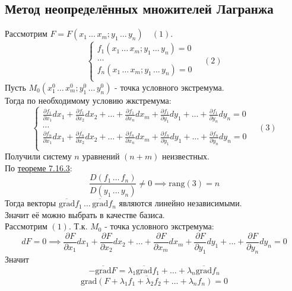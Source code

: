 \documentclass[12pt]{article}
\begin{document}
    \subsection{Метод неопределённых множителей Лагранжа}
    Рассмотрим $F = F(x_1\, \dots\, x_m; y_1\, \dots\, y_n) \quad (1)$.
    \[ \begin{cases}
        f_1(x_1\, \dots\, x_m; y_1\, \dots\, y_n) = 0\\
        \dots\\
        f_n(x_1\, \dots\, x_m; y_1\, \dots\, y_n) = 0\\
    \end{cases} \quad (2) \]
    Пусть $M_0 (x^0_1\, \dots\, x^0_m; y^0_1\, \dots\, y^0_n)$ - точка условного экстремума.\\
    Тогда по необходимому условию жкстремума:
    \[ 
        \begin{cases}
            \frac{\partial f_1}{\partial x_1}dx_1 + \frac{\partial f_1}{\partial x_2}dx_2 + \dots + \frac{\partial f_1}{\partial x_n}dx_m + \frac{\partial f_1}{\partial y_1}dy_1 + \dots + \frac{\partial f_1}{\partial y_n}dy_n = 0\\
            \dots\\
            \frac{\partial f_n}{\partial x_1}dx_1 + \frac{\partial f_n}{\partial x_2}dx_2 + \dots + \frac{\partial f_n}{\partial x_n}dx_m + \frac{\partial f_n}{\partial y_1}dy_1 + \dots + \frac{\partial f_n}{\partial y_n}dy_n = 0\\
        \end{cases} \quad (3)
    \]
    Получили систему $n$ уравнений $(n + m)$ неизвестных.\\
    По \hyperref[th:7.16.3]{теореме 7.16.3}:
    \[ \frac{D(f_1\, \dots\, f_n)}{D(y_1\, \dots\, y_n)} \ne 0 \implies \text{rang}(3) = n \]
    Тогда векторы $\overline{\text{grad}}f_1\, \dots\, \overline{\text{grad}}f_n$ являются линейно независимыми.\\
    Значит её можно выбрать в качестве базиса.\\
    Рассмотрим $(1)$. Т.к. $M_0$ - точка условного экстремума:
    \[ dF = 0 \implies \frac{\partial F}{\partial x_1}dx_1 + \frac{\partial F}{\partial x_2}dx_2 + \dots + \frac{\partial F}{\partial x_m}dx_m + \frac{\partial F}{\partial y_1}dy_1 + \dots + \frac{\partial F}{\partial y_n}dy_n = 0 \]
    Значит 
    \[ -\overline{\text{grad}}F = \lambda_1 \overline{\text{grad}}f_1 + \dots + \lambda_n \overline{\text{grad}}f_n \]
    \[ \overline{\text{grad}(F + \lambda_1 f_1 + \lambda_2 f_2 + \dots + \lambda_n f_n)} = 0 \]
\end{document}

